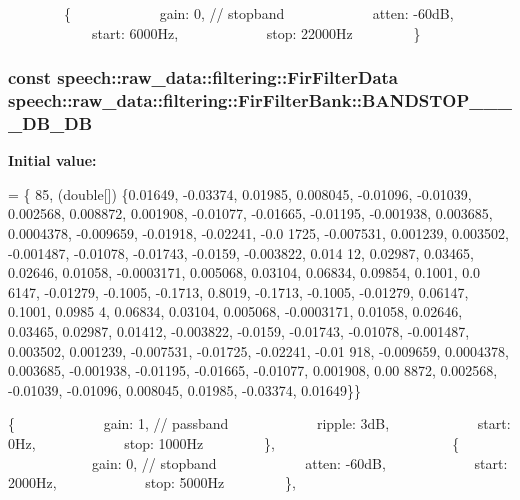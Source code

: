         \{             gain\+: 0, // stopband             atten\+: -\/60d\+B,             start\+: 6000\+Hz,             stop\+: 22000\+Hz         \} \hypertarget{classspeech_1_1raw__data_1_1filtering_1_1FirFilterBank_aaecaed690bc2ca0ec02ae8dd29491d15}{
\subsubsection[{B\+A\+N\+D\+S\+T\+O\+P\+\_\+44100\+\_\+2000\+\_\+5000\+\_\+3\+D\+B\+\_\+60\+D\+B}]{\setlength{\rightskip}{0pt plus 5cm}const {\bf speech\+::raw\+\_\+data\+::filtering\+::\+Fir\+Filter\+Data} speech\+::raw\+\_\+data\+::filtering\+::\+Fir\+Filter\+Bank\+::\+B\+A\+N\+D\+S\+T\+O\+P\+\_\+\_\+\_\+\_\+D\+B\+\_\+D\+B\hspace{0.3cm}{\ttfamily [static]}}}\label{classspeech_1_1raw__data_1_1filtering_1_1FirFilterBank_aaecaed690bc2ca0ec02ae8dd29491d15}
{\bfseries Initial value\+:}
\begin{DoxyCode}
= \{
        85,
        (\textcolor{keywordtype}{double}[]) \{0.01649, -0.03374, 0.01985, 0.008045, -0.01096, -0.01039, 0.002568, 0.008872, 0.001908,
       -0.01077,
                    -0.01665, -0.01195, -0.001938, 0.003685, 0.0004378, -0.009659, -0.01918, -0.02241, -0.0
      1725,
                    -0.007531, 0.001239, 0.003502, -0.001487, -0.01078, -0.01743, -0.0159, -0.003822, 0.014
      12, 0.02987,
                    0.03465, 0.02646, 0.01058, -0.0003171, 0.005068, 0.03104, 0.06834, 0.09854, 0.1001, 0.0
      6147,
                    -0.01279, -0.1005, -0.1713, 0.8019, -0.1713, -0.1005, -0.01279, 0.06147, 0.1001, 0.0985
      4, 0.06834,
                    0.03104, 0.005068, -0.0003171, 0.01058, 0.02646, 0.03465, 0.02987, 0.01412, -0.003822, 
      -0.0159,
                    -0.01743, -0.01078, -0.001487, 0.003502, 0.001239, -0.007531, -0.01725, -0.02241, -0.01
      918,
                    -0.009659, 0.0004378, 0.003685, -0.001938, -0.01195, -0.01665, -0.01077, 0.001908, 0.00
      8872,
                    0.002568, -0.01039, -0.01096, 0.008045, 0.01985, -0.03374, 0.01649\}\}
\end{DoxyCode}
\{             gain\+: 1, // passband             ripple\+: 3d\+B,             start\+: 0\+Hz,             stop\+: 1000\+Hz         \},                          \{             gain\+: 0, // stopband             atten\+: -\/60d\+B,             start\+: 2000\+Hz,             stop\+: 5000\+Hz         \},

